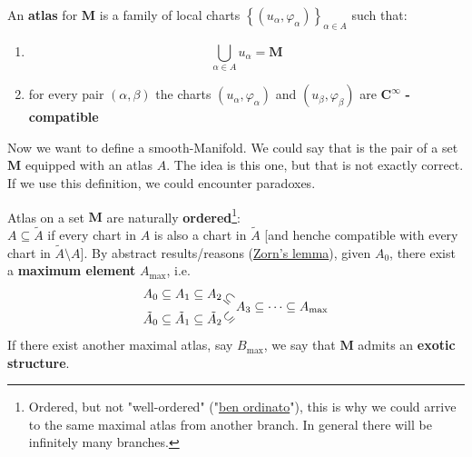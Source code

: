 \documentclass[../main.tex]{subfiles}
\begin{document}
\begin{definition}
An \textbf{atlas} for $\mathbf{M}$ is a family of local charts \(\left\{(u_{\alpha},\varphi_{\alpha})\right\}_{\alpha\in A}\) such that:
\begin{enumerate}
    \item $$\bigcup_{\alpha\in A}u_{\alpha}=\mathbf{M}$$
    \item for every pair $(\alpha,\beta)$ the charts $(u_{\alpha},\varphi_{\alpha})$ and $(u_{\beta},\varphi_{\beta})$ are $\mathbf{C}^{\infty}$ \textbf{-compatible}
\end{enumerate}
\end{definition}
Now we want to define a smooth-Manifold. We could say that is the pair of a set $\mathbf{M}$ equipped with an atlas $A$. The idea is this one, but that is not exactly correct. If we use this definition, we could encounter paradoxes.
\begin{kaobox}[frametitle=Remark]
Atlas on a set $\mathbf{M}$ are naturally \textbf{ordered}\footnote{Ordered, but not "well-ordered" ("\href{https://it.wikipedia.org/wiki/Buon_ordine}{ben ordinato}"), this is why we could arrive to the same maximal atlas from another branch. In general there will be infinitely many branches.}:\\
$A\subseteq \tilde{A}$ if every chart in $A$ is also a chart in $\tilde{A}$ [and henche compatible with every chart in $\tilde{A}\setminus A$]. By abstract results/reasons (\href{https://it.wikipedia.org/wiki/Lemma_di_Zorn}{Zorn's lemma}), given $A_0$, there exist a \textbf{maximum element} $A_{\textrm{max}}$, i.e.
\[
\begin{split}
    A_0 \subseteq A_1 \subseteq A_2  \rotatebox{-40}{$\subseteq$}\\
    \tilde{A}_0 \subseteq \tilde{A}_1 \subseteq \tilde{A}_2 \rotatebox{40}{$\subseteq$}
\end{split}
 A_3 \subseteq \dots \subseteq A_{\textrm{max}}
\]
If there exist another maximal atlas, say $B_{\textrm{max}}$, we say that $\mathbf{M}$ admits an \textbf{exotic structure}.
\end{kaobox}
\end{document}
